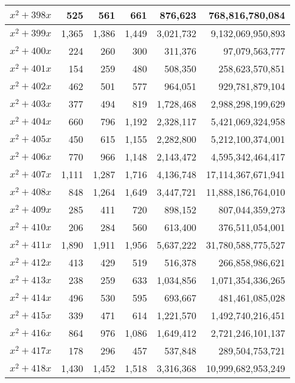 \documentclass[a4paper]{amsproc}
\theoremstyle{plain}
\theoremstyle{named}
\begin{document}
\begin{longtable}{ | l | r | r | r | r | r | }
$x^2 + 398x$ & 525 & 561 & 661 & 876{,}623 & 768{,}816{,}780{,}084 \\ \hline
$x^2 + 399x$ & 1{,}365 & 1{,}386 & 1{,}449 & 3{,}021{,}732 & 9{,}132{,}069{,}950{,}893 \\ \hline
$x^2 + 400x$ & 224 & 260 & 300 & 311{,}376 & 97{,}079{,}563{,}777 \\ \hline
$x^2 + 401x$ & 154 & 259 & 480 & 508{,}350 & 258{,}623{,}570{,}851 \\ \hline
$x^2 + 402x$ & 462 & 501 & 577 & 964{,}051 & 929{,}781{,}879{,}104 \\ \hline
$x^2 + 403x$ & 377 & 494 & 819 & 1{,}728{,}468 & 2{,}988{,}298{,}199{,}629 \\ \hline
$x^2 + 404x$ & 660 & 796 & 1{,}192 & 2{,}328{,}117 & 5{,}421{,}069{,}324{,}958 \\ \hline
$x^2 + 405x$ & 450 & 615 & 1{,}155 & 2{,}282{,}800 & 5{,}212{,}100{,}374{,}001 \\ \hline
$x^2 + 406x$ & 770 & 966 & 1{,}148 & 2{,}143{,}472 & 4{,}595{,}342{,}464{,}417 \\ \hline
$x^2 + 407x$ & 1{,}111 & 1{,}287 & 1{,}716 & 4{,}136{,}748 & 17{,}114{,}367{,}671{,}941 \\ \hline
$x^2 + 408x$ & 848 & 1{,}264 & 1{,}649 & 3{,}447{,}721 & 11{,}888{,}186{,}764{,}010 \\ \hline
$x^2 + 409x$ & 285 & 411 & 720 & 898{,}152 & 807{,}044{,}359{,}273 \\ \hline
$x^2 + 410x$ & 206 & 284 & 560 & 613{,}400 & 376{,}511{,}054{,}001 \\ \hline
$x^2 + 411x$ & 1{,}890 & 1{,}911 & 1{,}956 & 5{,}637{,}222 & 31{,}780{,}588{,}775{,}527 \\ \hline
$x^2 + 412x$ & 413 & 429 & 519 & 516{,}378 & 266{,}858{,}986{,}621 \\ \hline
$x^2 + 413x$ & 238 & 259 & 633 & 1{,}034{,}856 & 1{,}071{,}354{,}336{,}265 \\ \hline
$x^2 + 414x$ & 496 & 530 & 595 & 693{,}667 & 481{,}461{,}085{,}028 \\ \hline
$x^2 + 415x$ & 339 & 471 & 614 & 1{,}221{,}570 & 1{,}492{,}740{,}216{,}451 \\ \hline
$x^2 + 416x$ & 864 & 976 & 1{,}086 & 1{,}649{,}412 & 2{,}721{,}246{,}101{,}137 \\ \hline
$x^2 + 417x$ & 178 & 296 & 457 & 537{,}848 & 289{,}504{,}753{,}721 \\ \hline
$x^2 + 418x$ & 1{,}430 & 1{,}452 & 1{,}518 & 3{,}316{,}368 & 10{,}999{,}682{,}953{,}249 \\ \hline

\end{longtable}
\end{document}
